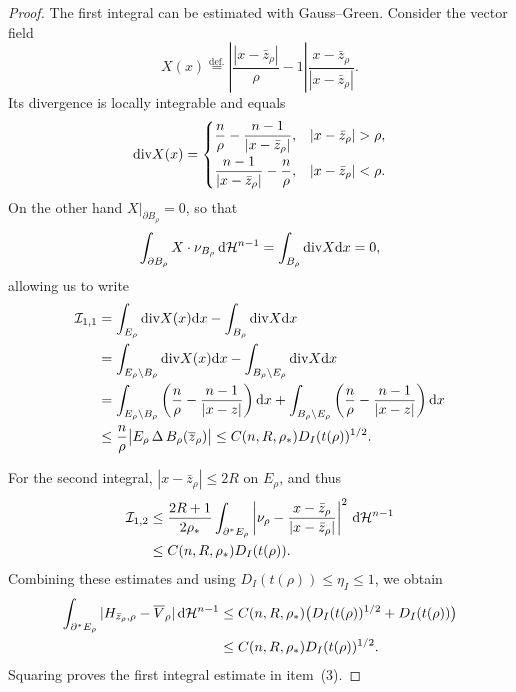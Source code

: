 \documentclass[11pt]{amsart}
\theoremstyle{plain}
\theoremstyle{definition}
\newcommand{\dHn}{\,\dd\mathcal{H}^{n-1}}
\newcommand{\eqdef}{\overset{\text{def.}}{=}}
\def\dd{{\rm d}}
\def\ddiv{{\mathop{\rm div}}}
\begin{document}
\begin{proof}
The first integral can be estimated with Gauss--Green. Consider the vector
field
\[
 X(x)\eqdef\left|\frac{|x-\bar z_\rho|}{\rho}-1\right|
 \frac{x-\bar z_\rho}{|x-\bar z_\rho|}.
\]
Its divergence is locally integrable and equals
\[
 \ddiv X(x)=
 \begin{cases}
 \dfrac n\rho-\dfrac{n-1}{|x-\bar z_\rho|},
 &|x-\bar z_\rho|>\rho,\\[8pt]
 \dfrac{n-1}{|x-\bar z_\rho|}-\dfrac n\rho,
 &|x-\bar z_\rho|<\rho.
 \end{cases}
\]
On the other hand $X\big|_{\partial B_\rho}=0$, so that
\[
  \int_{\partial B_\rho}X\cdot\nu_{B_\rho}\dHn=\int_{B_\rho}\ddiv X\dd x=0,
\]
allowing us to write
\begin{equation}\label{eq.I11_estimate}
  \begin{aligned}
    \mathcal{I}_{1,1}&=
    \int_{E_\rho}\ddiv X(x)\dd x-\int_{B_\rho}\ddiv X\dd x \\
    &=\int_{E_\rho\setminus B_\rho}\ddiv X(x)\dd x-\int_{B_\rho\setminus E_\rho}\ddiv X\dd x\\
    &=\int_{E_\rho\setminus B_\rho}\left(\frac{n}{\rho}-\frac{n-1}{|x-z|}\right)\dd x
    +\int_{B_\rho\setminus E_\rho}\left(\frac{n}{\rho}-\frac{n-1}{|x-z|}\right)\dd x\\
    &\le\frac{n}{\rho}\bigl|E_\rho\,\Delta\,B_\rho(\overline{z}_\rho)\bigr|
    \le C(n,R,\rho_*)D_I(t(\rho))^{1/2}.
  \end{aligned}
\end{equation}

For the second integral, $|x-\bar z_\rho|\le2R$ on $E_\rho$, and thus
\begin{align}
 \mathcal I_{1,2}
 &\le\frac{2R+1}{2\rho_*}
 \int_{\partial^*E_\rho}
 \left|\nu_\rho-\frac{x-\bar z_\rho}{|x-\bar z_\rho|}\right|^2\dHn\notag\\
 &\le C(n,R,\rho_*)D_I(t(\rho)).
 \label{eq.I12_estimate}
\end{align}
Combining these estimates and using $D_I(t(\rho))\le\eta_I\le1$, we obtain
\begin{align*}
 \int_{\partial^*E_\rho}
 |H_{\bar z_\rho,\rho}-\overline V_\rho|\dHn
 &\le C(n,R,\rho_*)
 \bigl(D_I(t(\rho))^{1/2}+D_I(t(\rho))\bigr)\\
 &\le C(n,R,\rho_*)D_I(t(\rho))^{1/2}.
\end{align*}
Squaring proves the first integral estimate in item~(3).


\end{proof}
\end{document}
